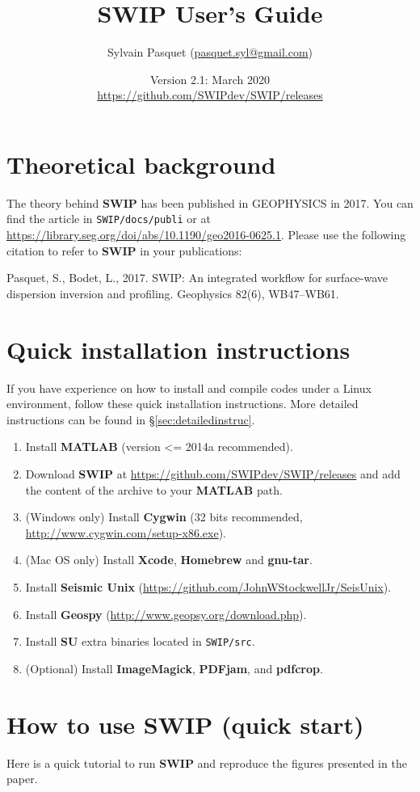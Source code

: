 \documentclass[twoside,a4paper]{article}
\title{\vspace{5cm}\Huge{\textbf{SWIP User's Guide}}}
\author{\Large{Sylvain Pasquet} (\url{pasquet.syl@gmail.com})}
\date{\LARGE{Version 2.1: March 2020}\\[2ex]
\large\url{https://github.com/SWIPdev/SWIP/releases}}
\def\SWIP{\textbf{SWIP}}
\def\SU{\textbf{SU}}
\def\SeismicUnix{\textbf{Seismic Unix}}
\def\Geopsy{\textbf{Geospy}}
\def\ImageMagick{\textbf{ImageMagick}}
\def\PDFjam{\textbf{PDFjam}}
\def\pdfcrop{\textbf{pdfcrop}}
\def\MATLAB{\textbf{MATLAB}}
\def\Cygwin{\textbf{Cygwin}}
\begin{document}
\maketitle
\thispagestyle{empty}
\newpage
\tableofcontents

\newpage
\section{Theoretical background}
The theory behind {\SWIP} has been published in GEOPHYSICS in 2017. You can find the article in \verb|SWIP/docs/publi| or at \url{https://library.seg.org/doi/abs/10.1190/geo2016-0625.1}. Please use the following citation to refer to {\SWIP} in your publications:

Pasquet, S., Bodet, L., 2017. SWIP: An integrated workflow for surface-wave dispersion inversion and profiling. Geophysics 82(6), WB47–WB61.

\section{Quick installation instructions}
If you have experience on how to install and compile codes under a Linux environment, follow these quick installation instructions. More detailed instructions can be found in §\ref{sec:detailedinstruc}.
\begin{enumerate}[leftmargin=*]
\setlength\itemsep{2ex}
\item Install {\MATLAB} (version <= 2014a recommended).
\item Download {\SWIP} at \url{https://github.com/SWIPdev/SWIP/releases} and add the content of the archive to your {\MATLAB} path.
\item (Windows only) Install {\Cygwin} (32 bits recommended, \url{http://www.cygwin.com/setup-x86.exe}).
\item (Mac OS only) Install \textbf{Xcode}, \textbf{Homebrew} and \textbf{gnu-tar}.
\item Install {\SeismicUnix} (\url{https://github.com/JohnWStockwellJr/SeisUnix}).
\item Install {\Geopsy} (\url{http://www.geopsy.org/download.php}).
\item Install {\SU} extra binaries located in \verb|SWIP/src|.
\item (Optional) Install {\ImageMagick}, {\PDFjam}, and {\pdfcrop}.
\end{enumerate}

\section{How to use SWIP (quick start)}
Here is a quick tutorial to run {\SWIP} and reproduce the figures presented in the paper.
\end{document}
